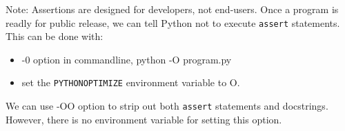 \begin{tcolorbox}
  Note:
  Assertions are designed for developers, not end-users.
  Once a program is readly for public release, we can tell Python not to execute \verb|assert| statements.
  This can be done with:
  \begin{itemize}
  \item -0 option in commandline, python -O program.py
  \item set the \verb|PYTHONOPTIMIZE| environment variable to O.
  \end{itemize}

  We can use -OO option to strip out both \verb|assert| statements and docstrings.
  However, there is no environment variable for setting this option.
\end{tcolorbox}


















































































